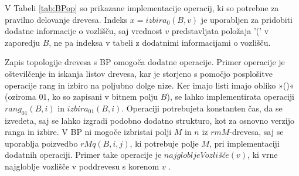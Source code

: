 V Tabeli \ref{tab:BPop} so prikazane implementacije operacij, ki so potrebne za pravilno delovanje drevesa. Indeks $x=izbira_0(B,v)$ je uporabljen za pridobiti dodatne informacije o vozlišču, saj vrednost $v$ predstavljata položaja '(' v zaporedju $B$, ne pa indeksa v tabeli z dodatnimi informacijami o vozlišču.

Zapis topologije drevesa s BP omogoča dodatne operacije. Primer operacije je oštevilčenje in iskanja listov drevesa, kar je storjeno s pomočjo posplošitve operacije rang in izbiro na poljubno dolge nize. Ker imajo listi imajo obliko »()« (oziroma $01$, ko so zapisani v bitnem polju $B$), se lahko implementirata operaciji $rang_{01}(B,i)$ in $izbira_{01}(B,i)$. Operaciji potrebujeta konstanten čas, da se izvedeta, saj se lahko izgradi podobno dodatno strukturo, kot za osnovno verzijo ranga in izbire. V BP ni mogoče izbristai polji $M$ in $n$ iz $rmM$-drevesa, saj se uporablja poizvedbo $rMq(B,i,j)$, ki potrebuje polje $M$, pri implementaciji dodatnih operaciji. Primer take operacije je $najglobljeVozli$\textit{šč}$e(v)$, ki vrne najgloblje vozlišče v poddrevesu s korenom $v$ \cite{Navarro2016}.
